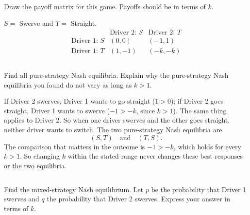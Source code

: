 \documentclass[newpages]{assignment}
\begin{document}
\subsection{}

\begin{problem}
    Draw the payoff matrix for this game. Payoffs should be in terms of \(k\).
\end{problem}

\begin{solution}
    \(S = \) Swerve and \(T = \) Straight.
    \[
        \begin{array}{c|cc}
                               & \text{Driver 2: }S & \text{Driver 2: }T \\
            \hline
            \text{Driver 1: }S & (0,0)              & (-1,1)             \\
            \text{Driver 1: }T & (1,-1)             & (-k,-k)
        \end{array}
    \]
\end{solution}

\subsection{}

\begin{problem}
    Find all pure-strategy Nash equilibria. Explain why the pure-strategy Nash
    equilibria you found do not vary as long as \(k > 1\).
\end{problem}

\begin{solution}
    If Driver 2 swerves, Driver 1 wants to go straight (\(1>0\)); if
    Driver 2 goes straight, Driver 1 wants to swerve (\(-1>-k\), since
    \(k>1\)). The same thing applies to Driver 2. So
    when one driver swerves and the other goes straight, neither driver
    wants to switch. The two pure-strategy Nash equilibria are
    \[
        (S,T)\quad\text{and}\quad(T,S).
    \]
    The comparison that matters in the outcome is \(-1>-k\), which
    holds for every \(k>1\). So changing \(k\) within the stated
    range never changes these best responses or the two equilibria.
\end{solution}

\subsection{}

\begin{problem}
    Find the mixed-strategy Nash equilibrium. Let \(p\) be the probability that
    Driver 1 swerves and \(q\) the probability that Driver 2 swerves. Express
    your answer in terms of \(k\).
\end{problem}
\end{document}

